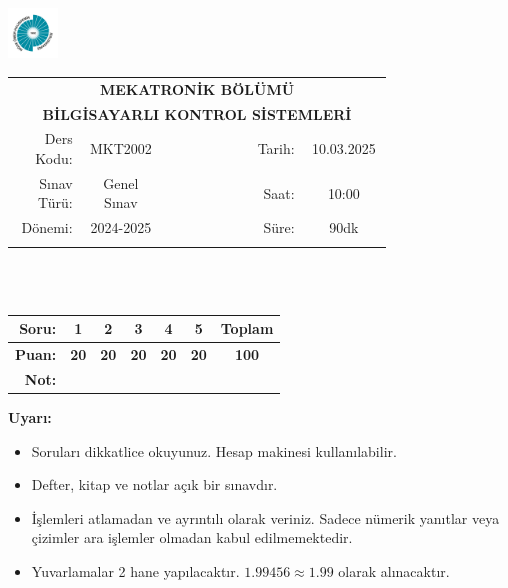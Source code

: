 \newcommand\UniversiteAdi{Niğde Ömer Halisdemir Üniversitesi}
\newcommand\BolumAdi{MEKATRONİK BÖLÜMÜ}
\newcommand\DersKodu{MKT2002}
\newcommand\DersAdi{BİLGİSAYARLI KONTROL SİSTEMLERİ}
\newcommand\SinavAdi{Genel Sınav}
\newcommand\SinavTarihi{10.03.2025}
\newcommand\SinavSaati{10:00}
\newcommand\SinavSuresi{90dk}

\pagestyle{fancy}
\fancyhf{} %
\noindent \includegraphics[width=0.1\textwidth]{logo}
\begin{tabular}{
    p{0.15\linewidth}
    p{0.15\linewidth}
    p{0.2\linewidth}
    p{0.1\linewidth}
    p{0.15\linewidth}}
    \multicolumn{5}{c}{\textbf{\BolumAdi}}\\
    \multicolumn{5}{c}{\textbf{\DersAdi}}\\\hline
    \multicolumn{1}{|r|}{Ders Kodu:}&
    \multicolumn{1}{|c|}{\DersKodu}&
    \multicolumn{1}{|c|}{}& 
    \multicolumn{1}{|r|}{Tarih:}&
    \multicolumn{1}{|c|}{\SinavTarihi} \\\hline
    \multicolumn{1}{|r|}{Sınav Türü:}&
    \multicolumn{1}{|c|}{\SinavAdi}&  
    \multicolumn{1}{|c|}{}&
    \multicolumn{1}{|r|}{Saat:}&
    \multicolumn{1}{|c|}{\SinavSaati}\\\hline
    \multicolumn{1}{|r|}{Dönemi:}&
    \multicolumn{1}{|c|}{2024-2025}&
    \multicolumn{1}{|c|}{}&
    \multicolumn{1}{|r|}{Süre:}&
    \multicolumn{1}{|c|}{\SinavSuresi} \\\hline
    &&&&\\
\end{tabular}\\\\
\noindent\begin{center}
\begin{tabular}{|r|c|c|c|c|c|c|}\hline
    \textbf{Soru:}&
    \textbf{1}&
    \textbf{2}&
    \textbf{3}&
    \textbf{4}&
    \textbf{5}&
    \textbf{Toplam}\\\hline
    \textbf{Puan:}&
    \textbf{20}&
    \textbf{20}&
    \textbf{20}&
    \textbf{20}&
    \textbf{20}&
    \textbf{100}\\\hline
    \textbf{Not:}&&&&&&\\\hline
\end{tabular}\end{center}
\noindent\textbf{Uyarı:}
\begin{itemize}\bfseries
    \item Soruları dikkatlice okuyunuz. Hesap makinesi kullanılabilir.
    \item Defter, kitap ve notlar açık bir sınavdır.
    \item İşlemleri atlamadan ve ayrıntılı olarak veriniz. Sadece nümerik yanıtlar veya çizimler ara işlemler olmadan kabul edilmemektedir.
    \item Yuvarlamalar 2 hane yapılacaktır. $\mathbf{1.99456\approx1.99}$ olarak alınacaktır.
\end{itemize}

